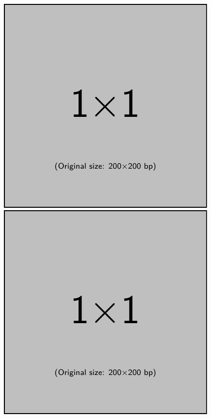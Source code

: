 \documentclass[dvipdfmx,conference,a4paper,nofonttune]{APSIPA}
\begin{document}
\begin{figure}[t]
   \centering
   \begin{minipage}{.45\hsize}
      \centering
      \includegraphics[width=.8\hsize]{figure/example-image-1x1.pdf}
   \end{minipage}
   \begin{minipage}{.45\hsize}
      \centering
      \includegraphics[width=.8\hsize]{figure/example-image-1x1.pdf}
   \end{minipage} \\[1em]
   \begin{minipage}{.45\hsize}

\end{minipage}
\end{figure}
\end{document}
